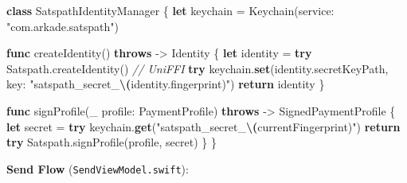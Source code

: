 \documentclass[
]{article}
\newenvironment{Shaded}{}{}
\newcommand{\CommentTok}[1]{\textcolor[rgb]{0.38,0.63,0.69}{\textit{#1}}}
\newcommand{\ControlFlowTok}[1]{\textcolor[rgb]{0.00,0.44,0.13}{\textbf{#1}}}
\newcommand{\DataTypeTok}[1]{\textcolor[rgb]{0.56,0.13,0.00}{#1}}
\newcommand{\ErrorTok}[1]{\textcolor[rgb]{1.00,0.00,0.00}{\textbf{#1}}}
\newcommand{\FunctionTok}[1]{\textcolor[rgb]{0.02,0.16,0.49}{#1}}
\newcommand{\KeywordTok}[1]{\textcolor[rgb]{0.00,0.44,0.13}{\textbf{#1}}}
\newcommand{\NormalTok}[1]{#1}
\newcommand{\OperatorTok}[1]{\textcolor[rgb]{0.40,0.40,0.40}{#1}}
\newcommand{\StringTok}[1]{\textcolor[rgb]{0.25,0.44,0.63}{#1}}
\newcommand{\VariableTok}[1]{\textcolor[rgb]{0.10,0.09,0.49}{#1}}
\begin{document}
\begin{Shaded}
\begin{Highlighting}[]
\KeywordTok{class}\NormalTok{ SatspathIdentityManager }\OperatorTok{\{}
    \KeywordTok{let} \VariableTok{keychain} \OperatorTok{=}\NormalTok{ Keychain}\OperatorTok{(}\NormalTok{service}\OperatorTok{:} \StringTok{"com.arkade.satspath"}\OperatorTok{)}

    \KeywordTok{func} \FunctionTok{createIdentity}\OperatorTok{()} \KeywordTok{throws}\NormalTok{ {-}\textgreater{} }\FunctionTok{Identity} \OperatorTok{\{}
        \KeywordTok{let} \VariableTok{identity} \OperatorTok{=} \ControlFlowTok{try}\NormalTok{ Satspath}\OperatorTok{.}\NormalTok{createIdentity}\OperatorTok{()}  \CommentTok{// UniFFI}
        \ControlFlowTok{try}\NormalTok{ keychain}\OperatorTok{.}\KeywordTok{set}\OperatorTok{(}\NormalTok{identity}\OperatorTok{.}\NormalTok{secretKeyPath}\OperatorTok{,}\NormalTok{ key}\OperatorTok{:} \StringTok{"satspath\_secret\_}\ErrorTok{\textbackslash{}(}\StringTok{identity.fingerprint)"}\OperatorTok{)}
        \KeywordTok{return}\NormalTok{ identity}
    \OperatorTok{\}}

    \KeywordTok{func} \FunctionTok{signProfile}\OperatorTok{(}\VariableTok{\_} \VariableTok{profile}\OperatorTok{:} \DataTypeTok{PaymentProfile}\OperatorTok{)} \KeywordTok{throws}\NormalTok{ {-}\textgreater{} }\FunctionTok{SignedPaymentProfile} \OperatorTok{\{}
        \KeywordTok{let} \VariableTok{secret} \OperatorTok{=} \ControlFlowTok{try}\NormalTok{ keychain}\OperatorTok{.}\KeywordTok{get}\OperatorTok{(}\StringTok{"satspath\_secret\_}\ErrorTok{\textbackslash{}(}\StringTok{currentFingerprint)"}\OperatorTok{)}
        \KeywordTok{return} \ControlFlowTok{try}\NormalTok{ Satspath}\OperatorTok{.}\NormalTok{signProfile}\OperatorTok{(}\NormalTok{profile}\OperatorTok{,}\NormalTok{ secret}\OperatorTok{)}
    \OperatorTok{\}}
\OperatorTok{\}}
\end{Highlighting}
\end{Shaded}

\textbf{Send Flow} (\texttt{SendViewModel.swift}):
\end{document}
